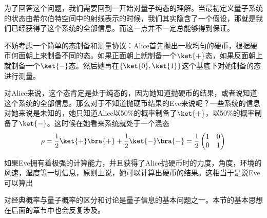 为了回答这个问题，我们需要回到一开始对量子纯态的理解。当最初定义量子系统的状态由希尔伯特空间中的射线表示的时候，我们其实隐含了一个假设，那就是我们已经获得了这个系统的全部信息。而这一点并不一定总能够得到保证。

不妨考虑一个简单的态制备和测量协议：Alice首先抛出一枚均匀的硬币，根据硬币何面朝上来制备不同的态。如果正面朝上就制备一个$\ket{+}$态，如果反面朝上就制备一个$\ket{-}$态。然后她再在$\{\ket{0},\ket{1}\}$这个基底下对她制备的态进行测量。

对Alice来说，这个态肯定是处于纯态的，因为她知道抛硬币的结果，或者说知道这个系统的全部信息。那么对于不知道抛硬币结果的Eve来说呢？一些系统的信息对她来说是未知的，她只知道Alice以50\%的概率制备了$\ket{+}$，以50\%的概率制备了$\ket{-}$。这时候在她看来系统就处于一个混态\begin{equation}
\rho=\frac{1}{2}\ket{+}\bra{+}+\frac{1}{2}\ket{-}\bra{-}=\frac{1}{2}\begin{pmatrix}
1 & 0\\
0 & 1
\end{pmatrix}
\end{equation}

如果Eve拥有着极强的计算能力，并且获得了Alice抛硬币时的力度，角度，环境的风速，湿度等一切信息，原则上说，她可以计算出硬币的结果。这相当于是说Eve可以算出

对经典概率与量子概率的区分和讨论是量子信息的基本问题之一。本节的基本思想在后面的章节中也会反复涉及。








